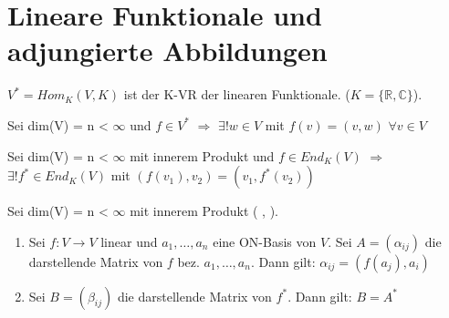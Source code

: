 \section{Lineare Funktionale und adjungierte Abbildungen}
\begin{definition}
$V^* = Hom_K(V,K)$ ist der K-VR der linearen Funktionale. ($K = \{\mathbb{R}, \mathbb{C}\}$).
\end{definition}

\begin{lemma}
Sei dim(V) = n < $\infty$ und $f \in V^*$ $\Rightarrow$ $\exists ! w \in V$ mit $f(v) = (v,w)$ $\forall v \in V$
\end{lemma}

\begin{theorem}
Sei dim(V) = n < $\infty$ mit innerem Produkt und $ f \in End_K(V)$ $\Rightarrow$ $\exists ! f^* \in End_K(V)$ mit $(f(v_1), v_2) = (v_1, f^*(v_2))$
\end{theorem}

\begin{lemma}
Sei dim(V) = n < $\infty$ mit innerem Produkt ( , ).
\begin{enumerate}
\item Sei $f: V \to V$ linear und $a_1, …, a_n$ eine ON-Basis von $V$. Sei $A = (\alpha_{ij})$ die darstellende Matrix von $f$ bez. $a_1, …, a_n$. Dann gilt: $\alpha_{ij} = (f(a_j), a_i)$
\item Sei $B = (\beta_{ij})$ die darstellende Matrix von $f^*$. Dann gilt: $B = A^*$
\end{enumerate}
\end{lemma}

